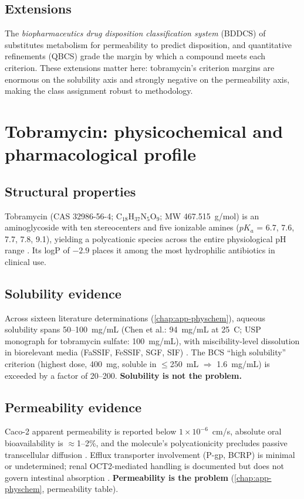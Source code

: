 \subsection{Extensions}
The \emph{biopharmaceutics drug disposition classification system} (BDDCS) of \citet{Wu2005} substitutes metabolism for permeability to predict disposition, and quantitative refinements (QBCS) grade the margin by which a compound meets each criterion. These extensions matter here: tobramycin's criterion margins are enormous on the solubility axis and strongly negative on the permeability axis, making the class assignment robust to methodology.

\section{Tobramycin: physicochemical and pharmacological profile}
\label{sec:lit-profile}

\subsection{Structural properties}
Tobramycin (CAS 32986-56-4; C$_{18}$H$_{37}$N$_{5}$O$_{9}$; MW 467.515~g/mol) is an aminoglycoside with ten stereocenters and five ionizable amines ($pK_a$ = 6.7, 7.6, 7.7, 7.8, 9.1), yielding a polycationic species across the entire physiological pH range \citep{PubChem2026, DrugBank2026}. Its logP of $-2.9$ places it among the most hydrophilic antibiotics in clinical use.

\subsection{Solubility evidence}
\label{sec:lit-solubility}
Across sixteen literature determinations (\cref{chap:app-physchem}), aqueous solubility spans 50--100~mg/mL (Chen et al.: 94~mg/mL at 25~\textdegree C; USP monograph for tobramycin sulfate: 100~mg/mL), with miscibility-level dissolution in biorelevant media (FaSSIF, FeSSIF, SGF, SIF) \citep{Chen2009}. The BCS ``high solubility'' criterion (highest dose, 400~mg, soluble in $\leq$250~mL $\Rightarrow$ 1.6~mg/mL) is exceeded by a factor of 20--200. \textbf{Solubility is not the problem.}

\subsection{Permeability evidence}
Caco-2 apparent permeability is reported below $1\times10^{-6}$~cm/s, absolute oral bioavailability is $\approx$1--2\%, and the molecule's polycationicity precludes passive transcellular diffusion \citep{Asad2023}. Efflux transporter involvement (P-gp, BCRP) is minimal or undetermined; renal OCT2-mediated handling is documented but does not govern intestinal absorption \citep{Asad2023}. \textbf{Permeability is the problem} (\cref{chap:app-physchem}, permeability table).


